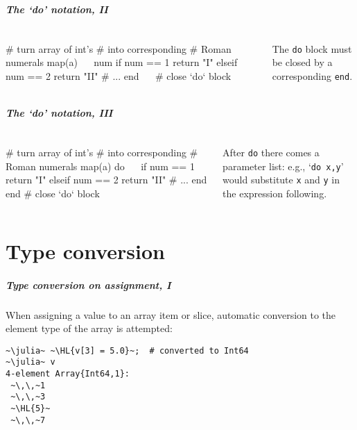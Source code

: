 \documentclass[english,serif,mathserif,xcolor=pdftex,dvipsnames,table]{beamer}
\begin{document}
\begin{frame}[fragile]
  \frametitle{The `do' notation, II}
  \begin{columns}
    \begin{column}{0.5\textwidth}
\begin{jl}
# turn array of int's
# into corresponding
# Roman numerals
map(a) ~~ num
  if num == 1
    return "I"
  elseif num == 2
    return "II"
    # ...
  end
~~ # close `do` block
\end{jl}
    \end{column}
    \begin{column}{0.5\textwidth}
      \raggedright

      The \lstinline|do| block must be closed by a corresponding
      \lstinline|end|.
    \end{column}
  \end{columns}
\end{frame}

\begin{frame}[fragile]
  \frametitle{The `do' notation, III}
  \begin{columns}
    \begin{column}{0.5\textwidth}
\begin{jl}
# turn array of int's
# into corresponding
# Roman numerals
map(a) do ~~
  if num == 1
    return "I"
  elseif num == 2
    return "II"
    # ...
  end
end # close `do` block
\end{jl}
    \end{column}
    \begin{column}{0.5\textwidth}
      \raggedright

      After \lstinline|do| there comes a parameter list:
      e.g., `\lstinline|do x,y|' would substitute \texttt{x} and
      \texttt{y} in the expression following.
    \end{column}
  \end{columns}
\end{frame}


\part{Type conversion}
\begin{frame}[fragile]
  \frametitle{Type conversion on assignment, I}
  When assigning a value to an array item or slice, automatic
  conversion to the element type of the array is attempted:
\begin{lstlisting}
~\julia~ ~\HL{v[3] = 5.0}~;  # converted to Int64
~\julia~ v
4-element Array{Int64,1}:
 ~\,\,~1
 ~\,\,~3
 ~\HL{5}~
 ~\,\,~7
\end{lstlisting}
\end{frame}
\end{document}

